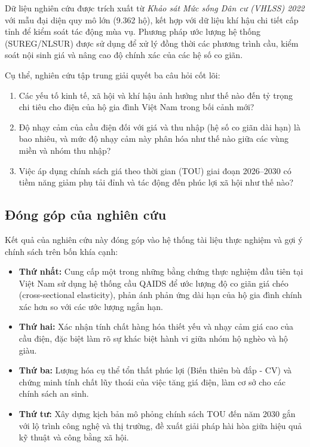 \documentclass[12pt,a4paper,oneside]{article}
\begin{document}
	Dữ liệu nghiên cứu được trích xuất từ \textit{Khảo sát Mức sống Dân cư (VHLSS) 2022} với mẫu đại diện quy mô lớn (9.362 hộ), kết hợp với dữ liệu khí hậu chi tiết cấp tỉnh để kiểm soát tác động mùa vụ. Phương pháp ước lượng hệ thống (SUREG/NLSUR) được sử dụng để xử lý đồng thời các phương trình cầu, kiểm soát nội sinh giá và nâng cao độ chính xác của các hệ số co giãn.
	
	Cụ thể, nghiên cứu tập trung giải quyết ba câu hỏi cốt lõi:
	\begin{enumerate}
		\item[(i)] Các yếu tố kinh tế, xã hội và khí hậu ảnh hưởng như thế nào đến tỷ trọng chi tiêu cho điện của hộ gia đình Việt Nam trong bối cảnh mới?
		\item[(ii)] Độ nhạy cảm của cầu điện đối với giá và thu nhập (hệ số co giãn dài hạn) là bao nhiêu, và mức độ nhạy cảm này phân hóa như thế nào giữa các vùng miền và nhóm thu nhập?
		\item[(iii)] Việc áp dụng chính sách giá theo thời gian (TOU) giai đoạn 2026--2030 có tiềm năng giảm phụ tải đỉnh và tác động đến phúc lợi xã hội như thế nào?
	\end{enumerate}
	
	\subsection{Đóng góp của nghiên cứu}
	
	Kết quả của nghiên cứu này đóng góp vào hệ thống tài liệu thực nghiệm và gợi ý chính sách trên bốn khía cạnh:
	\begin{itemize}
		\item \textbf{Thứ nhất:} Cung cấp một trong những bằng chứng thực nghiệm đầu tiên tại Việt Nam sử dụng hệ thống cầu QAIDS để ước lượng độ co giãn giá chéo (cross-sectional elasticity), phản ánh phản ứng dài hạn của hộ gia đình chính xác hơn so với các ước lượng ngắn hạn.
		\item \textbf{Thứ hai:} Xác nhận tính chất hàng hóa thiết yếu và nhạy cảm giá cao của cầu điện, đặc biệt làm rõ sự khác biệt hành vi giữa nhóm hộ nghèo và hộ giàu.
		\item \textbf{Thứ ba:} Lượng hóa cụ thể tổn thất phúc lợi (Biến thiên bù đắp - CV) và chứng minh tính chất lũy thoái của việc tăng giá điện, làm cơ sở cho các chính sách an sinh.
		\item \textbf{Thứ tư:} Xây dựng kịch bản mô phỏng chính sách TOU đến năm 2030 gắn với lộ trình công nghệ và thị trường, đề xuất giải pháp hài hòa giữa hiệu quả kỹ thuật và công bằng xã hội.
	\end{itemize}
	
\end{document}
